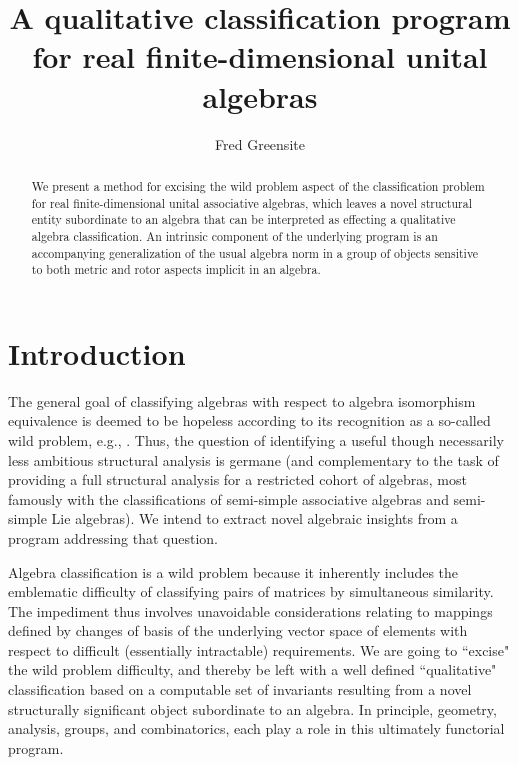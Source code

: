 \documentclass{amsart}
\numberwithin{equation}{section}
\theoremstyle{definition}
\numberwithin{theorem}{section}
\begin{document}
       
             \title{A qualitative classification program for real finite-dimensional unital algebras}
    \author{Fred Greensite}
    
   \begin{abstract} We present a method for excising the wild problem aspect of the classification problem for real finite-dimensional unital associative algebras, which leaves a novel structural entity subordinate to an algebra that can be interpreted as effecting a qualitative algebra classification.  An intrinsic component of the underlying program is an accompanying generalization of the usual algebra norm in a group of objects sensitive to both metric and rotor aspects implicit in an algebra.  \end{abstract}
        
  \maketitle
  
 

 
  \section{Introduction} The general goal of classifying algebras with respect to algebra isomorphism equivalence is deemed to be hopeless according to its recognition as a so-called wild problem, e.g., \cite{drozd:1972,prest:1991,sergeichuk:2000,belitskii:2005}.   
      Thus, the question of identifying a useful though necessarily less ambitious structural analysis is germane (and complementary to the task of providing a full structural analysis for a restricted cohort of algebras, most famously with the classifications of semi-simple associative algebras and semi-simple Lie algebras).  We intend to extract novel algebraic insights from a program addressing that question.  
      
Algebra classification is a wild problem because it inherently includes the emblematic difficulty of classifying pairs of matrices by simultaneous similarity.   The impediment thus involves unavoidable considerations relating to mappings defined by changes of basis of the underlying vector space of elements with respect to difficult (essentially intractable) requirements.  We are going to ``excise" the wild problem difficulty, and thereby be left with a well defined ``qualitative" classification based on a computable set of invariants resulting from a novel structurally significant object subordinate to an algebra.  In principle, geometry, analysis, groups, and combinatorics, each play a role in this ultimately functorial program.  
\end{document}
